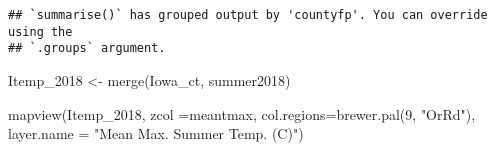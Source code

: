 \documentclass[
]{book}
\newenvironment{Shaded}{\begin{snugshade}}{\end{snugshade}}
\newcommand{\AttributeTok}[1]{\textcolor[rgb]{0.77,0.63,0.00}{#1}}
\newcommand{\DecValTok}[1]{\textcolor[rgb]{0.00,0.00,0.81}{#1}}
\newcommand{\FunctionTok}[1]{\textcolor[rgb]{0.00,0.00,0.00}{#1}}
\newcommand{\NormalTok}[1]{#1}
\newcommand{\OtherTok}[1]{\textcolor[rgb]{0.56,0.35,0.01}{#1}}
\newcommand{\StringTok}[1]{\textcolor[rgb]{0.31,0.60,0.02}{#1}}
\begin{document}
\begin{verbatim}
## `summarise()` has grouped output by 'countyfp'. You can override using the
## `.groups` argument.
\end{verbatim}

\begin{Shaded}
\begin{Highlighting}[]
\NormalTok{Itemp\_2018 }\OtherTok{\textless{}{-}} \FunctionTok{merge}\NormalTok{(Iowa\_ct, summer2018)}

\FunctionTok{mapview}\NormalTok{(Itemp\_2018, }\AttributeTok{zcol =}\StringTok{\textquotesingle{}meantmax\textquotesingle{}}\NormalTok{, }\AttributeTok{col.regions=}\FunctionTok{brewer.pal}\NormalTok{(}\DecValTok{9}\NormalTok{, }\StringTok{"OrRd"}\NormalTok{), }\AttributeTok{layer.name =} \StringTok{"Mean Max. Summer Temp. (C)"}\NormalTok{)}
\end{Highlighting}
\end{Shaded}


  
\end{document}

